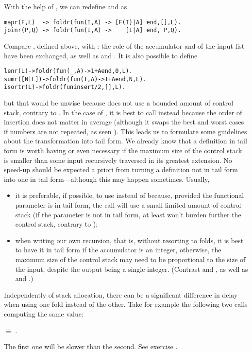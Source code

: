 With the help of , we can redefine 
and  as
\begin{verbatim}
mapr(F,L)  -> foldr(fun(I,A) -> [F(I)|A] end,[],L).
joinr(P,Q) -> foldr(fun(I,A) ->    [I|A] end, P,Q).
\end{verbatim}
Compare , defined above, with :
the role of the accumulator and of the input list have been exchanged,
as well as  and . It is also
possible to define
\begin{alltt}
lenr(L)     -> foldr(fun(_,A) -> 1+A end, 0,L).\hfill% \emph{To avoid}
sumr([N|L]) -> foldr(fun(I,A) -> I+A end, N,L).\hfill% \emph{To avoid}
isortr(L)   -> foldr(fun insert/2,       [],L).\hfill% \emph{To avoid}
\end{alltt}
but that would be unwise because  does not use a
bounded amount of control stack, contrary to . In the
case of , it is best to call 
instead because the order of insertion does not matter in average
(although it swaps the best and worst cases if numbers are not
repeated, as seen ). This leads us to
formulate some guidelines about the transformation into tail form. We
already know that a definition in tail form is worth having or even
necessary if the maximum size of the control stack is smaller than
some input recursively traversed in its greatest extension. No
speed\hyp{}up should be expected a priori from turning a definition
not in tail form into one in tail form---although this may happen
sometimes. Usually,
\begin{itemize}

  \item it is preferable, if possible, to use 
    instead of  because, provided the functional
    parameter is in tail form, the call will use a small limited
    amount of control stack (if the parameter is not in tail form, at
    least  won't burden further the control stack,
    contrary to );

  \item when writing our own recursion, that is, without resorting to
    folds, it is best to have it in tail form if the accumulator is an
    integer, otherwise, the maximum size of the control stack may need
    to be proportional to the size of the input, despite the output
    being a single integer. (Contrast  and
    , as well as  and
    .)

\end{itemize}
Independently of stack allocation, there can be a significant
difference in delay when using one fold instead of the other. Take for
example the following two calls computing the same value:
\begin{center}
\(\mathrel{\equiv}\)
.
\end{center}
The first one will be slower than the second. See exercise
.

